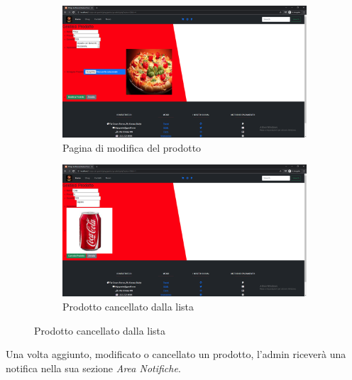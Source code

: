 \documentclass[a4paper,12pt]{report}
\begin{document}
	\begin{figure}[H]
		\begin{subfigure}{.6\textwidth}
			\centering
			\includegraphics[width=1\linewidth]{./Images/Admin_modifica_prodotto.png}
			\caption{Pagina di modifica del prodotto}
			\label{fig:modifica}
		\end{subfigure}
		\begin{subfigure}{.6\textwidth}
			\centering
			\includegraphics[width=1\linewidth]{./Images/Admin_cancella_prodotto.png}
			\caption{Prodotto cancellato dalla lista}
			\label{fig:cancella}
		\end{subfigure}
		\label{fig:operazioni_sul_prodotto}
	\end{figure}

	\textsf{Una volta aggiunto, modificato o cancellato un prodotto, l'admin riceverà una notifica nella sua sezione \emph{Area Notifiche}.}\\
	
\end{document}
